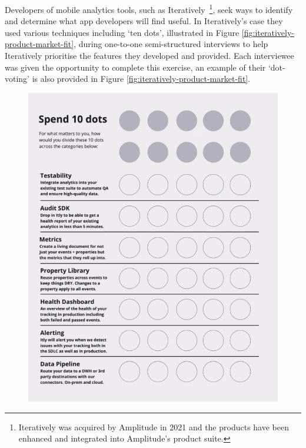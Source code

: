 Developers of mobile analytics tools, such as Iteratively~\footnote{Iteratively was acquired by Amplitude in 2021 and the products have been enhanced and integrated into Amplitude's product suite.}, seek ways to identify and determine what app developers will find useful. In Iteratively's case they used various techniques including `ten dots', illustrated in Figure \ref{fig:iteratively-product-market-fit}, during one-to-one semi-structured interviews to help Iteratively prioritise the features they developed and provided. Each interviewee was given the opportunity to complete this exercise, an example of their `dot-voting' is also provided in Figure \ref{fig:iteratively-product-market-fit}.

\begin{figure}[htbp!]
\centering
\begin{minipage}{.45\textwidth}
  \centering
  \includegraphics[width=\textwidth]{images/iteratively/spend-10-dots.png}

\end{minipage}
\end{figure}
